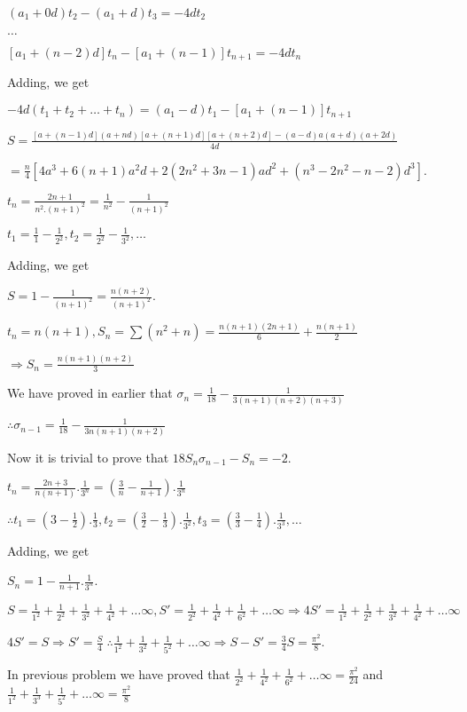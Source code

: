   $(a_1 + 0d)t_2 - (a_1 + d)t_3 = -4dt_2$

  $\ldots$

  $[a_1 + (n - 2)d]t_n - [a_1+(n - 1)]t_{n + 1} = -4dt_n$

  Adding, we get

  $-4d(t_1 + t_2 + \ldots + t_n) = (a_1 - d)t_1 - [a_1 + (n - 1)]t_{n + 1}$

  $S = \frac{[a + (n - 1)d](a + nd)[a + (n + 1)d][a + (n + 2)d] - (a - d)a(a + d)(a + 2d)}{4d}$

  $= \frac{n}{4}[4a^3 + 6(n + 1)a^2d + 2(2n^2 + 3n - 1)ad^2 + (n^3 - 2n^2 - n - 2)d^3]$.
\item $t_n = \frac{2n + 1}{n^2.(n + 1)^2} = \frac{1}{n^2} - \frac{1}{(n + 1)^2}$

  $t_1 = \frac{1}{1} - \frac{1}{2^2}, t_2 = \frac{1}{2^2} - \frac{1}{3^2}, \ldots$

  Adding, we get

  $S = 1 - \frac{1}{(n + 1)^2} = \frac{n(n + 2)}{(n + 1)^2}$.
\item $t_n = n(n + 1), S_n = \sum(n^2 + n) = \frac{n(n + 1)(2n + 1)}{6} + \frac{n(n +1)}{2}$

  $\Rightarrow S_n = \frac{n(n + 1)(n + 2)}{3}$

  We have proved in earlier that $\sigma_n = \frac{1}{18} - \frac{1}{3(n + 1)(n + 2)(n + 3)}$

  $\therefore \sigma_{n - 1} = \frac{1}{18} - \frac{1}{3n(n + 1)(n + 2)}$

  Now it is trivial to prove that $18S_n\sigma_{n - 1} - S_n = -2$.
\item $t_n = \frac{2n + 3}{n(n + 1)}.\frac{1}{3^n} = \left(\frac{3}{n} - \frac{1}{n +
  1}\right).\frac{1}{3^n}$

  $\therefore t_1 = \left(3 - \frac{1}{2}\right).\frac{1}{3}, t_2 = \left(\frac{3}{2} -
  \frac{1}{3}\right).\frac{1}{3^2}, t_3 = \left(\frac{3}{3} - \frac{1}{4}\right).\frac{1}{3^3}, \ldots$

  Adding, we get

  $S_n = 1 - \frac{1}{n + 1}.\frac{1}{3^n}$.
\item $S = \frac{1}{1^2} + \frac{1}{2^2} + \frac{1}{3^2} + \frac{1}{4^2} + \ldots\infty, S' = \frac{1}{2^2}
  + \frac{1}{4^2} + \frac{1}{6^2} + \ldots \infty\Rightarrow  4S' = \frac{1}{1^2} + \frac{1}{2^2} + \frac{1}{3^2} +
  \frac{1}{4^2} + \ldots\infty$

  $4S' = S \Rightarrow S' = \frac{S}{4}\;\therefore \frac{1}{1^2} + \frac{1}{3^2} + \frac{1}{5^2} + \ldots \infty \Rightarrow  S - S' =
  \frac{3}{4}S = \frac{\pi^2}{8}$.
\item In previous problem we have proved that $\frac{1}{2^2} + \frac{1}{4^2} + \frac{1}{6^2} + \ldots \infty =
  \frac{\pi^2}{24}$ and $\frac{1}{1^2} + \frac{1}{3^3} + \frac{1}{5^2} + \ldots \infty = \frac{\pi^2}{8}$

